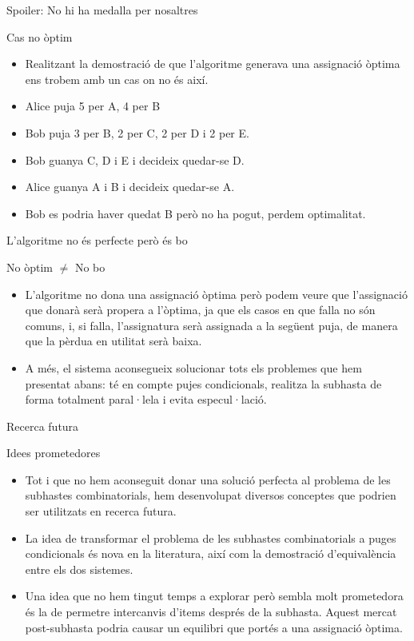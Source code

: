 \documentclass[twocolumn]{beamer}
\begin{document}
\begin{frame}{Spoiler: No hi ha medalla per nosaltres}
\begin{block}{Cas no òptim}
	\begin{itemize}
		\item Realitzant la demostració de que l'algoritme generava una assignació òptima ens trobem amb un cas on no és així.
		\item Alice puja 5 per A, 4 per B
		\item Bob puja 3 per B, 2 per C, 2 per D i 2 per E.
		\item Bob guanya C, D i E i decideix quedar-se D.
		\item Alice guanya A i B i decideix quedar-se A.
		\item Bob es podria haver quedat B però no ha pogut, perdem optimalitat.
	\end{itemize}
\end{block}
\end{frame}

\begin{frame}{L'algoritme no és perfecte però és bo}
\begin{block}{No òptim $\neq$ No bo}
	\begin{itemize}
		\item L'algoritme no dona una assignació òptima però podem veure que l'assignació que donarà serà propera a l'òptima, ja que els casos en que falla no són comuns, i, si falla, l'assignatura serà assignada a la següent puja, de manera que la pèrdua en utilitat serà baixa.
		\item A més, el sistema aconsegueix solucionar tots els problemes que hem presentat abans: té en compte pujes condicionals, realitza la subhasta de forma totalment paral·lela i evita especul·lació.
	\end{itemize}
\end{block}
\end{frame}

\begin{frame}{Recerca futura}
\begin{block}{Idees prometedores}
	\begin{itemize}
		\item Tot i que no hem aconseguit donar una solució perfecta al problema de les subhastes combinatorials, hem desenvolupat diversos conceptes que podrien ser utilitzats en recerca futura.
		\item La idea de transformar el problema de les subhastes combinatorials a puges condicionals és nova en la literatura, així com la demostració d'equivalència entre els dos sistemes.
		\item Una idea que no hem tingut temps a explorar però sembla molt prometedora és la de permetre intercanvis d'items després de la subhasta. Aquest mercat post-subhasta podria causar un equilibri que portés a una assignació òptima.
	\end{itemize}
\end{block}
\end{frame}
\end{document}
